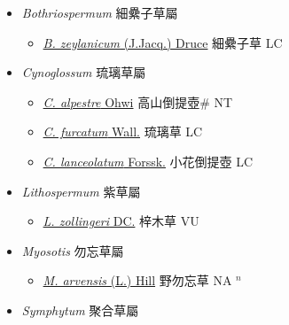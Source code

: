 
  \begin{itemize}
 \item[] \textit{Bothriospermum} 細纍子草屬
                    
  \begin{itemize}
        \item[] \href{http://www.theplantlist.org/tpl1.1/search?q=Bothriospermum+zeylanicum}{\textit{B. zeylanicum} (J.Jacq.) Druce}   細纍子草 LC
  \end{itemize}
 \item[] \textit{Cynoglossum} 琉璃草屬
                    
  \begin{itemize}
        \item[] \href{http://www.theplantlist.org/tpl1.1/search?q=Cynoglossum+alpestre}{\textit{C. alpestre} Ohwi}   高山倒提壺\# NT
        \item[] \href{http://www.theplantlist.org/tpl1.1/search?q=Cynoglossum+furcatum}{\textit{C. furcatum} Wall.}   琉璃草 LC
        \item[] \href{http://www.theplantlist.org/tpl1.1/search?q=Cynoglossum+lanceolatum}{\textit{C. lanceolatum} Forssk.}   小花倒提壺 LC
  \end{itemize}
 \item[] \textit{Lithospermum} 紫草屬
                    
  \begin{itemize}
        \item[] \href{http://www.theplantlist.org/tpl1.1/search?q=Lithospermum+zollingeri}{\textit{L. zollingeri} DC.}   梓木草 VU
  \end{itemize}
 \item[] \textit{Myosotis} 勿忘草屬
                    
  \begin{itemize}
        \item[] \href{http://www.theplantlist.org/tpl1.1/search?q=Myosotis+arvensis}{\textit{M. arvensis} (L.) Hill}   野勿忘草 NA $^n$
  \end{itemize}
 \item[] \textit{Symphytum} 聚合草屬
                    

\end{itemize}
